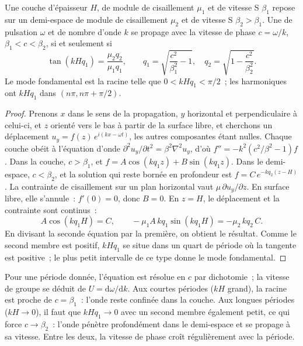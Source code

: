 \begin{theorem}\label{thm:b3:seismology-imaging:love}
Une couche d'épaisseur $H$, de module de cisaillement $\mu_1$ et de vitesse S $\beta_1$ repose sur un
demi-espace de module de cisaillement $\mu_2$ et de vitesse S $\beta_2 > \beta_1$. Une
 de pulsation $\omega$ et de nombre d'onde $k$ se propage avec la
vitesse de phase $c = \omega/k$, $\beta_1 < c < \beta_2$, si et seulement si
\[
  \tan\!\left(kH q_1\right) = \frac{\mu_2 q_2}{\mu_1 q_1},
  \qquad q_1 = \sqrt{\frac{c^2}{\beta_1^2} - 1},\quad
  q_2 = \sqrt{1 - \frac{c^2}{\beta_2^2}} .
\]
Le mode fondamental est la racine telle que $0 < kHq_1 < \pi/2$~; les harmoniques ont
$kHq_1$ dans $(n\pi, n\pi + \pi/2)$.
\end{theorem}

\begin{proof}
Prenons $x$ dans le sens de la propagation, $y$ horizontal et perpendiculaire à celui-ci, et $z$ orienté vers le bas à partir de
la surface libre, et cherchons un déplacement
$u_y = f(z)\,e^{i(kx - \omega t)}$, les autres composantes étant nulles. Chaque couche
obéit à l'équation d'onde $\partial^2 u_y/\partial t^2 = \beta^2\nabla^2 u_y$, d'où
$f'' = -k^2\left(c^2/\beta^2 - 1\right) f$. Dans la couche, $c > \beta_1$, et
$f = A\cos(kq_1z) + B\sin(kq_1z)$. Dans le demi-espace, $c < \beta_2$, et la
solution qui reste bornée en profondeur est $f = C\,e^{-kq_2(z - H)}$.
La contrainte de cisaillement sur un plan horizontal vaut $\mu\,\partial u_y/\partial z$.
En surface libre, elle s'annule~: $f'(0) = 0$, donc $B = 0$. En $z = H$, le
déplacement et la contrainte sont continus~:
\[
  A\cos(kq_1H) = C, \qquad -\mu_1 A\,kq_1\sin(kq_1H) = -\mu_2\,kq_2\,C .
\]
En divisant la seconde équation par la première, on obtient le résultat. Comme le
second membre est positif, $kHq_1$ se situe dans un quart de période où la
tangente est positive~; le plus petit intervalle de ce type donne le mode fondamental.
\end{proof}

Pour une période donnée, l'équation est résolue en $c$ par dichotomie~; la vitesse de
groupe se déduit de $U = \mathrm d\omega/\mathrm dk$. Aux courtes périodes
($kH$ grand), la racine est proche de $c = \beta_1$~: l'onde reste confinée dans la couche. Aux
longues périodes ($kH \to 0$), il faut que $kHq_1 \to 0$ avec un second membre
également petit, ce qui force $c \to \beta_2$~: l'onde pénètre profondément dans le
demi-espace et se propage à sa vitesse. Entre les deux, la vitesse de phase croît
régulièrement avec la période.

